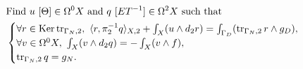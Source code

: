 \begin{discussion}
  \begin{equation}
    \begin{split}
      & \text{Find $u\ [\Theta] \in \Omega^0 X$ and
        $q\ [E T^{-1}] \in \Omega^2 X$ such that} \\
      &
      \begin{cases}
        \forall r \in \mathop{\rm Ker}\nolimits \mathop{\rm tr}\nolimits_{\Gamma_N, 2},\
          \langle r,\pi_2^{-1} q\rangle_{X, 2} + \int_{X} (u \wedge d_2 r)
          = \int_{\Gamma_D} (\mathop{\rm tr}\nolimits_{\Gamma_N, 2} r \wedge g_D), \\
        \forall v \in \Omega^0 X,\
          \int_X (v \wedge d_2 q) = - \int_X (v \wedge f), \\
        \mathop{\rm tr}\nolimits_{\Gamma_N, 2} q = g_N.
      \end{cases}
    \end{split}
  \end{equation}
\end{discussion}
